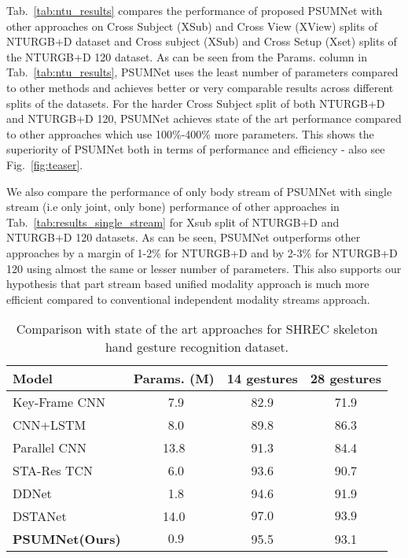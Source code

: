 \documentclass[runningheads]{llncs}
\begin{document}
Tab.~\ref{tab:ntu_results} compares the performance of proposed PSUMNet with other approaches on Cross Subject (XSub) and Cross View (XView) splits of NTURGB+D dataset \cite{Shahroudy_2016_CVPR} and Cross subject (XSub) and Cross Setup (Xset) splits of the NTURGB+D 120 dataset\cite{Liu_2019_NTURGBD120}. As can be seen from the Params. column in Tab.~\ref{tab:ntu_results}, PSUMNet uses the least number of parameters compared to other methods and achieves better or very comparable results across different splits of the datasets. For the harder Cross Subject split of both NTURGB+D and NTURGB+D 120, PSUMNet achieves state of the art performance compared to other approaches which use 100\%-400\% more parameters. This shows the superiority of PSUMNet both in terms of performance and efficiency - also see Fig.~\ref{fig:teaser}.

We also compare the performance of only body stream of PSUMNet with single stream (i.e only joint, only bone) performance of other approaches in Tab.~\ref{tab:results_single_stream} for Xsub split of NTURGB+D and NTURGB+D 120 datasets. As can  be seen, PSUMNet outperforms other approaches by a margin of 1-2\% for NTURGB+D and by 2-3\% for NTURGB+D 120 using almost the same or lesser number of parameters. This also supports our hypothesis that part stream based unified modality approach is much more efficient compared to conventional independent modality streams approach.



\begin{table}[!t]
  \resizebox{0.75\linewidth}{!} 
    {\begin{tabular}{l|c|cc}
    \toprule
Model & Params. (M) &  14 gestures & 28 gestures\\
    \midrule
    Key-Frame CNN \cite{de20173d} & $\,\,$7.9 & 82.9 & 71.9 \\
    CNN+LSTM \cite{nunez2018convolutional} & $\,\,$8.0 & 89.8 & 86.3 \\
    Parallel CNN\cite{devineau2018convolutional} & 13.8 & 91.3 & 84.4\\
    STA-Res TCN \cite{hou2018spatial} & $\,\,$6.0 & 93.6 & 90.7\\
    DDNet \cite{yang2019make} & $\,\,$1.8 & 94.6 & 91.9\\
    DSTANet \cite{dstanet_accv2020} & 14.0 & $\mathbf{97.0}$ & $\mathbf{93.9}$ \\
    \midrule
    \textbf{PSUMNet(Ours)} & $\mathbf{\,\,0.9}$ & 95.5 & 93.1\\
  \bottomrule
\end{tabular}
}
\caption{\label{tab:shrec_results}Comparison with state of the art approaches for SHREC skeleton hand gesture recognition dataset.}
  
\end{table}
\end{document}

